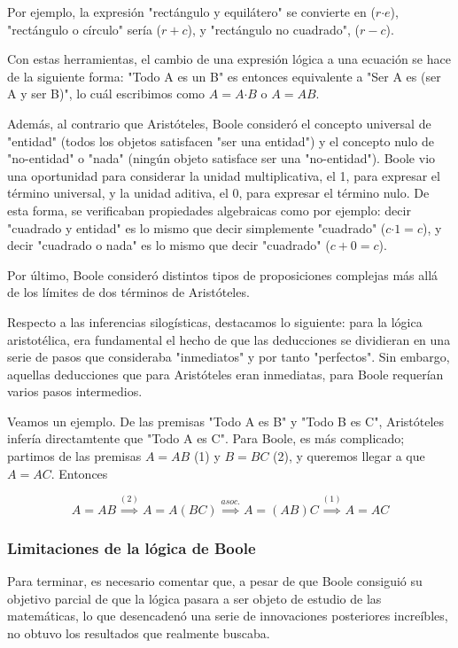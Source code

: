 \documentclass{article}
\begin{document}
Por ejemplo, la expresión "rectángulo y equilátero" se convierte en ($r \text{·} e$), "rectángulo o círculo" sería ($r + c$), y "rectángulo no cuadrado", ($r - c$).

Con estas herramientas, el cambio de una expresión lógica a una ecuación se hace de la siguiente forma: "Todo A es un B" es entonces equivalente a "Ser A es (ser A y ser B)", lo cuál escribimos como $A = A \text{·} B$ o $A = AB$.

Además, al contrario que Aristóteles, Boole consideró el concepto universal de "entidad" (todos los objetos satisfacen "ser una entidad") y el concepto nulo de "no-entidad" o "nada" (ningún objeto satisface ser una "no-entidad"). Boole vio una oportunidad para considerar la unidad multiplicativa, el 1, para expresar el término universal, y la unidad aditiva, el 0, para expresar el término nulo. De esta forma, se verificaban propiedades algebraicas como por ejemplo: decir "cuadrado y entidad" es lo mismo que decir simplemente "cuadrado" ($c \text{·} 1 = c$), y decir "cuadrado o nada" es lo mismo que decir "cuadrado" ($c + 0 = c$).

Por último, Boole consideró distintos tipos de proposiciones complejas más allá de los límites de dos términos de Aristóteles.

Respecto a las inferencias silogísticas, destacamos lo siguiente: para la lógica aristotélica, era fundamental el hecho de que las deducciones se dividieran en una serie de pasos que consideraba "inmediatos" y por tanto "perfectos". Sin embargo, aquellas deducciones que para Aristóteles eran inmediatas, para Boole requerían varios pasos intermedios\cite{boole2003laws}.

Veamos un ejemplo. De las premisas "Todo A es B" y "Todo B es C", Aristóteles infería directamtente que "Todo A es C". Para Boole, es más complicado; partimos de las premisas $A = AB$ (1) y $B = BC$ (2), y queremos llegar a que $A = AC$. Entonces\cite{gasser2000john}

$$
   A = AB \overset{(2)}{\implies} A = A(BC) \overset{asoc.}{\implies} A = (AB)C \overset{(1)}{\implies} A = AC
$$

\subsubsection{Limitaciones de la lógica de Boole}

Para terminar, es necesario comentar que, a pesar de que Boole consiguió su objetivo parcial de que la lógica pasara a ser objeto de estudio de las matemáticas, lo que desencadenó una serie de innovaciones posteriores increíbles, no obtuvo los resultados que realmente buscaba.
\end{document}
